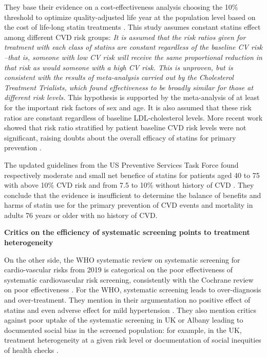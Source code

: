\documentclass[10pt,letterpaper]{article}
\begin{document}
They base their evidence on a cost-effectiveness analysis choosing the 10\%
threshold to optimize quality-adjusted life year at the population level based
on the cost of life-long statin treatments \cite{guthrie2023competing}. This
study assumes constant statins effect among different CVD risk groups:
\emph{It is assumed that the risk ratios given for treatment with each class
    of statins are constant regardless of the baseline CV risk --that is, someone
    with low CV risk will receive the same proportional reduction in that risk as
    would someone with a high CV risk. This is unproven, but is consistent with
    the results of meta-analysis carried out by the Cholesterol Treatment
    Trialists, which found effectiveness to be broadly similar for those at
    different risk levels.} This hypothesis is supported by the meta-analysis of
\cite{brugts2009benefits} at least for the important risk factors of sex and
age. It is also assumed that these risk ratios are constant regardless of
baseline LDL-cholesterol levels. More recent work showed that risk ratio
stratified by patient baseline CVD risk levels were not significant, raising
doubts about the overall efficacy of statins for primary prevention \cite[Table 1]{byrne2019statins}.

The updated guidelines from the US Preventive Services Task Force found
respectively moderate and small net benefice of statins for patients aged 40
to 75 with above 10\% CVD risk and from 7.5 to 10\% without history of CVD
\cite{chou2022statin}. They conclude that the evidence is insufficient to
determine the balance of benefits and harms of statin use for the primary
prevention of CVD events and mortality in adults 76 years or older with no
history of CVD.


\textbf{Critics on the efficiency of systematic screening points to treatment heterogeneity}

On the other side, the WHO systematic review on systematic screening for
cardio-vascular risks from 2019 \cite{eriksen2021effectiveness} is
categorical on the poor effectiveness of systematic cardiovascular risk
screening, consistently with the Cochrane review on poor effectiveness
\cite{krogsboll2012general}. For the WHO, systematic screening leads to
over-diagnosis and over-treatment. They mention in their argumentation no
positive effect of statins and even adverse effect for mild hypertension
\cite{diao2012pharmacotherapy}. They also mention critics against poor
uptake of the systematic screening in UK or Albany leading to documented
social bias in the screened population: for example, in the UK, treatment
heterogeneity at a given risk level \cite{van2013efficiency} or documentation
of social inequities of health checks \cite{krska2016implementation}.
\end{document}
